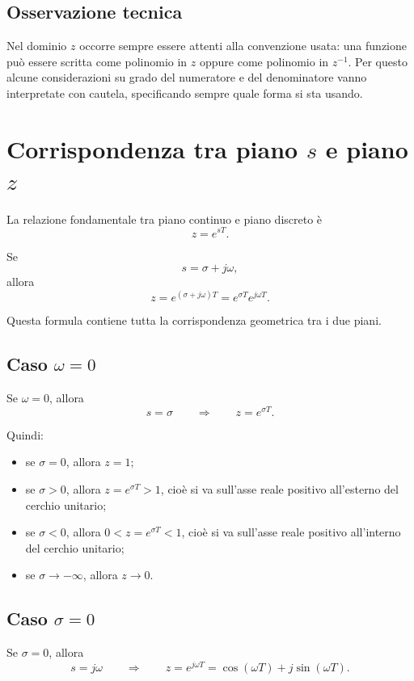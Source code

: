 \subsection{Osservazione tecnica}

Nel dominio \(z\) occorre sempre essere attenti alla convenzione usata:
una funzione può essere scritta come polinomio in \(z\) oppure come polinomio in \(z^{-1}\).
Per questo alcune considerazioni su grado del numeratore e del denominatore
vanno interpretate con cautela, specificando sempre quale forma si sta usando.

\section{Corrispondenza tra piano \(s\) e piano \(z\)}

La relazione fondamentale tra piano continuo e piano discreto è
\[
z=e^{sT}.
\]

Se
\[
s=\sigma+j\omega,
\]
allora
\[
z=e^{(\sigma+j\omega)T}=e^{\sigma T}e^{j\omega T}.
\]

Questa formula contiene tutta la corrispondenza geometrica tra i due piani.

\subsection{Caso \(\omega=0\)}

Se \(\omega=0\), allora
\[
s=\sigma
\qquad\Longrightarrow\qquad
z=e^{\sigma T}.
\]

Quindi:
\begin{itemize}
    \item se \(\sigma=0\), allora \(z=1\);
    \item se \(\sigma>0\), allora \(z=e^{\sigma T}>1\), cioè si va sull'asse reale positivo
    all'esterno del cerchio unitario;
    \item se \(\sigma<0\), allora \(0<z=e^{\sigma T}<1\), cioè si va sull'asse reale positivo
    all'interno del cerchio unitario;
    \item se \(\sigma\to -\infty\), allora \(z\to 0\).
\end{itemize}

\subsection{Caso \(\sigma=0\)}

Se \(\sigma=0\), allora
\[
s=j\omega
\qquad\Longrightarrow\qquad
z=e^{j\omega T}=\cos(\omega T)+j\sin(\omega T).
\]

